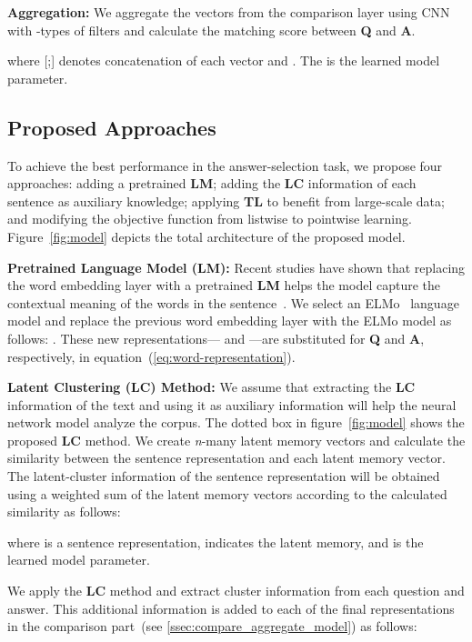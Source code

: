 \documentclass[sigconf]{acmart}
\begin{document}
\vspace*{1mm}
\noindent\textbf{Aggregation: }
We aggregate the vectors from the comparison layer using CNN~\cite{kim2014convolutional} with -types of filters and calculate the matching score between \textbf{Q} and \textbf{A}.

where [;] denotes concatenation of each vector  and . The  is the learned model parameter.

\subsection{Proposed Approaches}
\label{ssec:proposed-approaches}
To achieve the best performance in the answer-selection task, we propose four approaches: adding a pretrained \textbf{LM}; adding the \textbf{LC} information of each sentence as auxiliary knowledge; applying \textbf{TL} to benefit from large-scale data; and modifying the objective function from listwise to pointwise learning. Figure~\ref{fig:model} depicts the total architecture of the proposed model.


\vspace*{2mm}
\noindent\textbf{Pretrained Language Model (LM): }
Recent studies have shown that replacing the word embedding layer with a pretrained \textbf{LM} helps the model capture the contextual meaning of the words in the sentence~\cite{peters2018deep,devlin2019bert}. We select an ELMo~\cite{peters2018deep} language model and replace the previous word embedding layer with the ELMo model as follows:
. 
These new representations— and —are substituted for \textbf{Q} and \textbf{A}, respectively, in equation~(\ref{eq:word-representation}).

\vspace*{2mm}
\noindent\textbf{Latent Clustering (LC) Method: }
We assume that extracting the \textbf{LC} information of the text and using it as auxiliary information will help the neural network model analyze the corpus.
The dotted box in figure~\ref{fig:model} shows the proposed \textbf{LC} method.
We create \textit{n}-many latent memory vectors  and calculate the similarity between the sentence representation and each latent memory vector. 
The latent-cluster information of the sentence representation will be obtained using a weighted sum of the latent memory vectors according to the calculated similarity as follows:

where  is a sentence representation,  indicates the latent memory, and  is the learned model parameter.

We apply the \textbf{LC} method and extract cluster information from each question and answer. This additional information is added to each of the final representations in the comparison part~(see \ref{ssec:compare_aggregate_model}) as follows:
\end{document}
